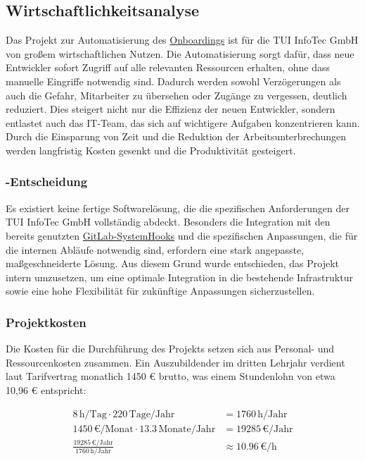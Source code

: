 \subsection{Wirtschaftlichkeitsanalyse}
\label{sec:Wirtschaftlichkeitsanalyse}

Das Projekt zur Automatisierung des \hyperlink{Onboarding}{\textcolor{AOBlau}{Onboardings}} ist für die \ac{TUI} InfoTec GmbH von großem wirtschaftlichen Nutzen. Die Automatisierung sorgt dafür, dass neue Entwickler sofort Zugriff auf alle relevanten Ressourcen erhalten, ohne dass manuelle Eingriffe notwendig sind. Dadurch werden sowohl Verzögerungen als auch die Gefahr, Mitarbeiter zu übersehen oder Zugänge zu vergessen, deutlich reduziert. Dies steigert nicht nur die Effizienz der neuen Entwickler, sondern entlastet auch das IT-Team, das sich auf wichtigere Aufgaben konzentrieren kann. Durch die Einsparung von Zeit und die Reduktion der Arbeitsunterbrechungen werden langfristig Kosten gesenkt und die Produktivität gesteigert.

\subsubsection{-Entscheidung}
\label{sec:MakeOrBuyEntscheidung}

Es existiert keine fertige Softwarelösung, die die spezifischen Anforderungen der \ac{TUI} InfoTec GmbH vollständig abdeckt. Besonders die Integration mit den bereits genutzten \hyperlink{GitLabSystemHooks}{\textcolor{AOBlau}{GitLab-SystemHooks}} und die spezifischen Anpassungen, die für die internen Abläufe notwendig sind, erfordern eine stark angepasste, maßgeschneiderte Lösung. Aus diesem Grund wurde entschieden, das Projekt intern umzusetzen, um eine optimale Integration in die bestehende Infrastruktur sowie eine hohe Flexibilität für zukünftige Anpassungen sicherzustellen.

\subsubsection{Projektkosten}
\label{sec:Projektkosten}

Die Kosten für die Durchführung des Projekts setzen sich aus Personal- und Ressourcenkosten zusammen. Ein Auszubildender im dritten Lehrjahr verdient laut Tarifvertrag monatlich 1450 € brutto, was einem Stundenlohn von etwa 10,96 € entspricht:

\begin{align}
    8 \, \text{h/Tag} \cdot 220 \, \text{Tage/Jahr} &= 1760 \, \text{h/Jahr} \tag{1}\\
    1450 \, \text{€/Monat} \cdot 13.3 \, \text{Monate/Jahr} &= 19285 \, \text{€/Jahr} \tag{2}\\
    \frac{19285 \, \text{€/Jahr}}{1760 \, \text{h/Jahr}} &\approx 10.96 \, \text{€/h} \tag{3}
\end{align}

